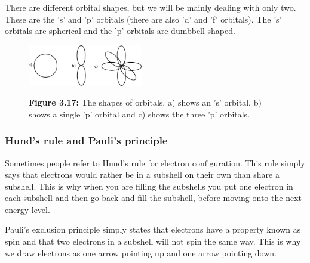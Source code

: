     \noindent
  \label{m38741*eip-793}There are different orbital shapes, but we will be mainly dealing with only two. These are the 's' and 'p' orbitals (there are also 'd' and 'f' orbitals). The 's' orbitals are spherical and the 'p' orbitals are dumbbell shaped. 
    \setcounter{subfigure}{0}
	\begin{figure}[H] %
    \begin{center}
    \label{m38741*uid8934!!!underscore!!!media}\label{m38741*uid8934!!!underscore!!!printimage}\includegraphics[width=5cm]{col11305.imgs/m38741_orbitals.png} %
      \vspace{2pt}
    \vspace{\rubberspace}\par \begin{cnxcaption}
	  \small \textbf{Figure 3.17: }The shapes of orbitals. a) shows an 's' orbital, b) shows a single 'p' orbital and c) shows the three 'p' orbitals.
	\end{cnxcaption}
    \vspace{.1in}
    \end{center}
 \end{figure}       \par \label{m38741*eip-581}
            \subsubsection{ Hund's rule and Pauli's principle}
            \nopagebreak
            \label{m38741*eip-188}
Sometimes people refer to Hund's rule for electron configuration. This rule simply says that electrons would rather be in a subshell on their own than share a subshell. This is why when you are filling the subshells you put one electron in each subshell and then go back and fill the subshell, before moving onto the next energy level.
\par 
\label{m38741*eip-id1167385514309}
Pauli's exclusion principle simply states that electrons have a property known as spin and that two electrons in a subshell will not spin the same way. This is why we draw electrons as one arrow pointing up and one arrow pointing down.
\par \label{m38741*uid104}
